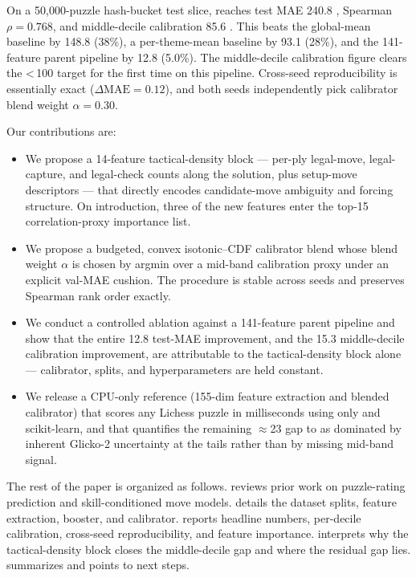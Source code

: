 On a 50{,}000-puzzle hash-bucket test slice, \ours reaches test MAE 240.8 \elo, Spearman $\rho = 0.768$, and middle-decile calibration 85.6 \elo. This beats the global-mean baseline by 148.8 \elo (38\%), a per-theme-mean baseline by 93.1 \elo (28\%), and the 141-feature parent pipeline by 12.8 \elo (5.0\%). The middle-decile calibration figure clears the \textless\,100 \elo target for the first time on this pipeline. Cross-seed reproducibility is essentially exact ($\Delta\text{MAE} = 0.12$), and both seeds independently pick calibrator blend weight $\alpha = 0.30$.

Our contributions are:
\begin{itemize}[leftmargin=*,itemsep=0pt,topsep=0pt]
    \item We propose a 14-feature tactical-density block --- per-ply legal-move, legal-capture, and legal-check counts along the solution, plus setup-move descriptors --- that directly encodes candidate-move ambiguity and forcing structure. On introduction, three of the new features enter the top-15 correlation-proxy importance list.
    \item We propose a budgeted, convex isotonic--CDF calibrator blend whose blend weight $\alpha$ is chosen by argmin over a mid-band calibration proxy under an explicit val-MAE cushion. The procedure is stable across seeds and preserves Spearman rank order exactly.
    \item We conduct a controlled ablation against a 141-feature parent pipeline and show that the entire 12.8 \elo test-MAE improvement, and the 15.3 \elo middle-decile calibration improvement, are attributable to the tactical-density block alone --- calibrator, splits, and hyperparameters are held constant.
    \item We release a CPU-only reference (155-dim feature extraction and blended calibrator) that scores any Lichess puzzle in milliseconds using only \pychess and scikit-learn, and that quantifies the remaining $\approx$23 \elo gap to \glickformer as dominated by inherent Glicko-2 uncertainty at the tails rather than by missing mid-band signal.
\end{itemize}

The rest of the paper is organized as follows.  reviews prior work on puzzle-rating prediction and skill-conditioned move models.  details the dataset splits, feature extraction, booster, and calibrator.  reports headline numbers, per-decile calibration, cross-seed reproducibility, and feature importance.  interprets why the tactical-density block closes the middle-decile gap and where the residual gap lies.  summarizes and points to next steps.
